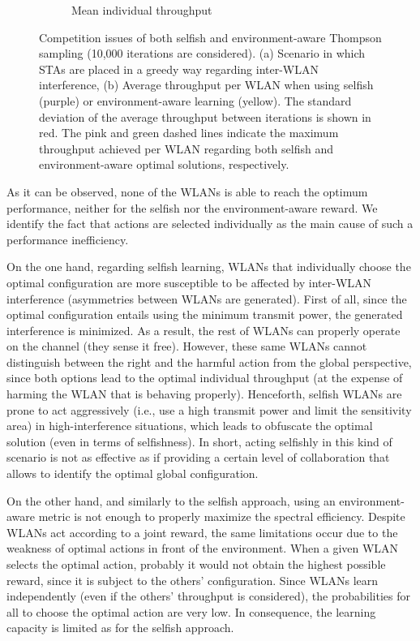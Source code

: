 \documentclass[preprint,12pt]{elsarticle}
\begin{document}
\begin{figure}[h!]
\begin{subfigure}[b]{0.4\textwidth}
		\caption{Mean individual throughput}
		\label{fig:4_grid_selfish_adversarial_mean_tpt}
	\end{subfigure}
	\caption{Competition issues of both selfish and environment-aware Thompson sampling (10,000 iterations are considered). (a) Scenario in which STAs are placed in a greedy way regarding inter-WLAN interference, (b) Average throughput per WLAN when using selfish (purple) or environment-aware learning (yellow). The standard deviation of the average throughput between iterations is shown in red. The pink and green dashed lines indicate the maximum throughput achieved per WLAN regarding both selfish and environment-aware optimal solutions, respectively.}
	\label{fig:4_grid_selfish_adversarial}
\end{figure}

As it can be observed, none of the WLANs is able to reach the optimum performance, neither for the selfish nor the environment-aware reward. We identify the fact that actions are selected individually as the main cause of such a performance inefficiency.

On the one hand, regarding selfish learning, WLANs that individually choose the optimal configuration are more susceptible to be affected by inter-WLAN interference (asymmetries between WLANs are generated). First of all, since the optimal configuration entails using the minimum transmit power, the generated interference is minimized. As a result, the rest of WLANs can properly operate on the channel (they sense it free). However, these same WLANs cannot distinguish between the right and the harmful action from the global perspective, since both options lead to the optimal individual throughput (at the expense of harming the WLAN that is behaving properly). Henceforth, selfish WLANs are prone to act aggressively (i.e., use a high transmit power and limit the sensitivity area) in high-interference situations, which leads to obfuscate the optimal solution (even in terms of selfishness). In short, acting selfishly in this kind of scenario is not as effective as if providing a certain level of collaboration that allows to identify the optimal global configuration.

On the other hand, and similarly to the selfish approach, using an environment-aware metric is not enough to properly maximize the spectral efficiency. Despite WLANs act according to a joint reward, the same limitations occur due to the weakness of optimal actions in front of the environment. When a given WLAN selects the optimal action, probably it would not obtain the highest possible reward, since it is subject to the others' configuration. Since WLANs learn independently (even if the others' throughput is considered), the probabilities for all to choose the optimal action are very low. In consequence, the learning capacity is limited as for the selfish approach.
\end{document}
